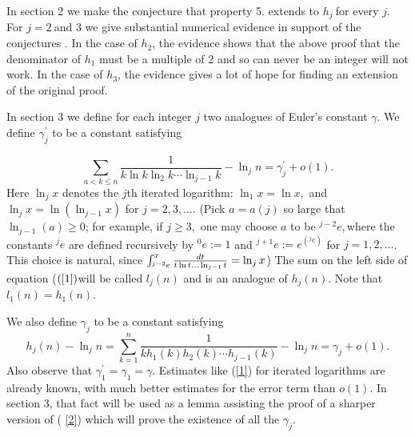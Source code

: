 \documentclass{article}
\begin{document}
In section 2 we make the conjecture that property 5. extends to $h_{j}\ $for
every $j$. For $j=2\ $and $3$ we give substantial numerical evidence in
support of the conjectures  \cite{Pa}. In the case of $h_{2}$, the evidence shows that
the above proof that the denominator of $h_{1}$ must be a multiple of $2$
and so can never be an integer will not work. In the case of $h_{3}$, the
evidence gives a lot of hope for finding an extension of the original proof.

In section 3 we define for each integer $j$ two analogues of Euler's
constant $\gamma $. We define $\gamma _{j}^{\prime }$ to be a constant
satisfying

\begin{equation}
\sum_{a<k\leq n}\frac{1}{k\ln k\ln _{2}k\cdots \ln _{j-1}k}-\ln _{j}n=\gamma
_{j}^{\prime }+o\left( 1\right) .  \label{1}
\end{equation}%
Here $\ln _{j}x$ denotes the $j$th iterated logarithm: $\ln _{1}x=\ln x,$
and $\ln _{j}x=\ln (\ln _{j-1}x)$ for $j=2,3,\dots $. (Pick $a=a\left(
j\right) $ so large that $\ln _{j-1}\left( a\right) \geq 0$; for example, if 
$j\geq 3,$ one may choose $a$ to be $^{j-2}e,$where the constants $^{j}e$
are defined recursively by $^{0}e:=1$ and $^{j+1}e:=e^{(^{j}e)}$ for $%
j=1,2,\dots $. This choice is natural, since $\int_{^{j-2}e}^{x}\frac{dt}{%
t\ln t...\ln _{j-1}t}=\ln _{j}x$) The sum on the left side of equation ($%
\left( \ref{1}\right) $will be called $l_{j}\left( n\right) $ and is an
analogue of $h_{j}\left( n\right) $. Note that $l_{1}\left( n\right)
=h_{1}\left( n\right) $.

We also define $\gamma _{j}$ to be a constant satisfying 
\begin{equation}
h_{j}\left( n\right) -\ln _{j}n=\sum_{k=1}^{n}\frac{1}{kh_{1}\left( k\right)
h_{2}\left( k\right) \cdots h_{j-1}\left( k\right) }-\ln _{j}n=\gamma
_{j}+o\left( 1\right) .  \label{2}
\end{equation}%
Also observe that $\gamma _{1}^{\prime }=\gamma _{1}=\gamma .$ Estimates
like (\ref{1}) for iterated logarithms are already known, with much better
estimates for the error term than $o\left( 1\right) $. In section 3, that
fact will be used as a lemma assisting the proof of a sharper version of (%
\ref{2}) which will prove the existence of all the $\gamma _{j}$.
\end{document}
